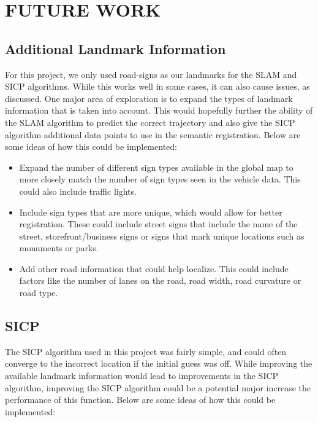 \documentclass[letterpaper, 10 pt, conference]{ieeeconf}  %
\begin{document}
\section{FUTURE WORK}

\subsection{Additional Landmark Information}
For this project, we only used road-signs as our landmarks for the SLAM and SICP algorithms. While this works well in some cases, it can also cause issues, as discussed. One major area of exploration is to expand the types of landmark information that is taken into account. This would hopefully further the ability of the SLAM algorithm to predict the correct trajectory and also give the SICP algorithm additional data points to use in the semantic registration. Below are some ideas of how this could be implemented:

\begin{itemize}
\item Expand the number of different sign types available in the global map to more closely match the number of sign types seen in the vehicle data. This could also include traffic lights.
\item Include sign types that are more unique, which would allow for better registration. These could include street signs that include the name of the street, storefront/business signs or signs that mark unique locations such as monuments or parks.
\item Add other road information that could help localize. This could include factors like the number of lanes on the road, road width, road curvature or road type.
\end{itemize}

\subsection{SICP}
The SICP algorithm used in this project was fairly simple, and could often converge to the incorrect location if the initial guess was off. While improving the available landmark information would lead to improvements in the SICP algorithm, improving the SICP algorithm could be a potential major increase the performance of this function. Below are some ideas of how this could be implemented:
\end{document}
